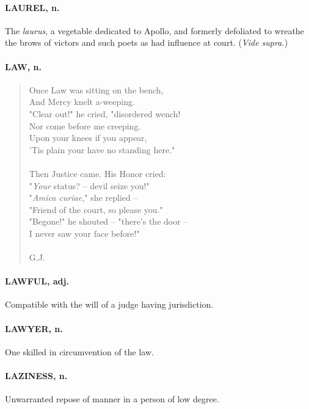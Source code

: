 \documentclass[11pt]{article}
\begin{document}
\paragraph{LAUREL, n.}  The {\em laurus}, a vegetable dedicated to Apollo, and
formerly defoliated to wreathe the brows of victors and such poets as
had influence at court.  ({\em Vide supra.})

\paragraph{LAW, n.}

\begin{quote}   Once Law was sitting on the bench, \\
      And Mercy knelt a-weeping. \\
  "Clear out!" he cried, "disordered wench! \\
      Nor come before me creeping. \\
  Upon your knees if you appear, \\
  'Tis plain your have no standing here." \\
 \\
  Then Justice came.  His Honor cried: \\
      "{\em Your} status? -- devil seize you!" \\
  "{\em Amica curiae,}" she replied -- \\
      "Friend of the court, so please you." \\
  "Begone!" he shouted -- "there's the door -- \\
  I never saw your face before!" \\
 \\
G.J. \end{quote}


\paragraph{LAWFUL, adj.}  Compatible with the will of a judge having jurisdiction.

\paragraph{LAWYER, n.}  One skilled in circumvention of the law.

\paragraph{LAZINESS, n.}  Unwarranted repose of manner in a person of low degree.
\end{document}
